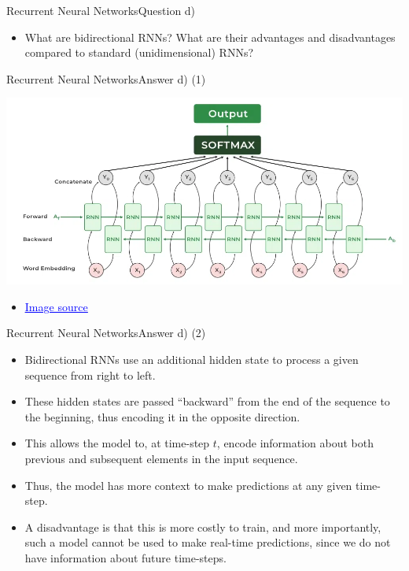 \documentclass[t]{beamer}
\begin{document}
\begin{frame}{Recurrent Neural Networks}{Question d)}
    \begin{itemize}
        \item What are bidirectional RNNs? What are their advantages and
              disadvantages compared to standard (unidimensional) RNNs?
    \end{itemize}
\end{frame}

\begin{frame}{Recurrent Neural Networks}{Answer d) (1)}
    \begin{center}
        \includegraphics[scale=0.30]{img/Bidirectional-Recurrent-Neural-Network.png}
    \end{center}
    \begin{itemize}
        \item \href{https://www.geeksforgeeks.org/bidirectional-rnns-in-nlp/}{\textcolor{blue}{\underline{Image source}}}
    \end{itemize}
\end{frame}

\begin{frame}{Recurrent Neural Networks}{Answer d) (2)}
    \begin{itemize}
        \item Bidirectional RNNs use an additional hidden state to process a
              given sequence from right to left.
        \item These hidden states are passed ``backward'' from the end of the
              sequence to the beginning, thus encoding it in the opposite
              direction.
        \item This allows the model to, at time-step $t$, encode information
              about both previous and subsequent elements in the input sequence.
        \item Thus, the model has more context to make predictions at any given
              time-step.
        \item A disadvantage is that this is more costly to train, and more
              importantly, such a model cannot be used to make real-time
              predictions, since we do not have information about future
              time-steps.
    \end{itemize}
\end{frame}
\end{document}
